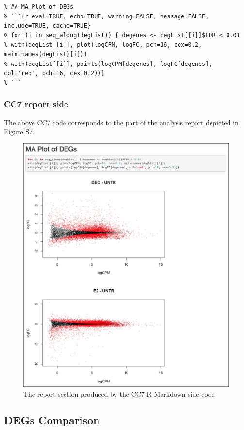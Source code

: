 \documentclass[]{article}
\begin{document}
\begin{verbatim}
% ## MA Plot of DEGs
% ```{r eval=TRUE, echo=TRUE, warning=FALSE, message=FALSE, include=TRUE, cache=TRUE}
% for (i in seq_along(degList)) { degenes <- degList[[i]]$FDR < 0.01
% with(degList[[i]], plot(logCPM, logFC, pch=16, cex=0.2, main=names(degList)[i]))
% with(degList[[i]], points(logCPM[degenes], logFC[degenes], col='red', pch=16, cex=0.2))}
% ```
\end{verbatim}

\newpage

\hypertarget{cc7-report-side}{%
\subsubsection{CC7 report side}\label{cc7-report-side}}

The above CC7 code corresponds to the part of the analysis report
depicted in Figure S7.

\begin{figure}[ht]

{\centering \includegraphics[width=0.7\linewidth]{imgs/7} 

}

\caption{The report section produced by the CC7 R Markdown side code}\label{fig:unnamed-chunk-16}
\end{figure}

\hypertarget{degs-comparison}{%
\subsection{DEGs Comparison}\label{degs-comparison}}
\end{document}
